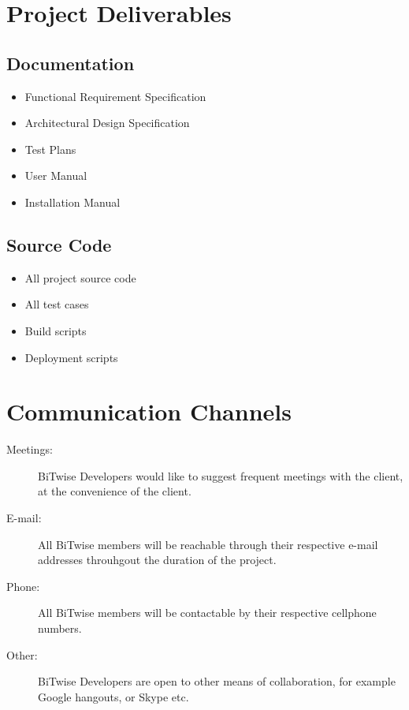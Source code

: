 \documentclass[a4paper]{article}
\begin{document}
	\section{Project Deliverables}
	
		\subsection{Documentation}
		
			\begin{itemize}
				\item Functional Requirement Specification
				\item Architectural Design Specification
				\item Test Plans
				\item User Manual
				\item Installation Manual
			\end{itemize}
			
		\subsection{Source Code}
		
			\begin{itemize}
				\item All project source code
				\item All test cases
				\item Build scripts
				\item Deployment scripts
			\end{itemize}
			
	
	\section{Communication Channels}
	
		\begin{description}
			\item [Meetings:] BiTwise Developers would like to suggest frequent meetings with the client, at the convenience of the client.
			\item [E-mail:] All BiTwise members will be reachable through their respective e-mail addresses throuhgout the duration of the project.
			\item [Phone:] All BiTwise members will be contactable by their respective cellphone numbers.
			\item [Other:] BiTwise Developers are open to other means of collaboration, for example Google hangouts, or Skype etc.
		\end{description}
\end{document}
